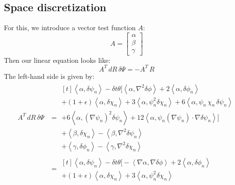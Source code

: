 \documentclass[reqno]{article}
\begin{document}
\subsection{Space discretization}
For this, we introduce a vector test function $A$:
\begin{equation}
    A
    =
    \begin{bmatrix}
        \alpha \\
        \beta \\
        \gamma
    \end{bmatrix}
\end{equation}
Then our linear equation looks like:
\begin{equation}
    A^T \, dR \, \delta \Psi
    =
    -A^T \, R
\end{equation}
The left-hand side is given by:
\begin{equation}
    \begin{split}
        A^T \, dR \, \delta \Psi
        &=
        \begin{multlined}[t]
            \left<\alpha, \delta \psi_n \right>
            - \delta t \theta \bigl[ \left< \alpha, \nabla^2 \delta \phi \right>
                + 2 \left< \alpha, \delta \phi_n \right> \\
                + \left(1 + \epsilon\right) \left< \alpha, \delta \chi_n \right>
                + 3 \left< \alpha, \psi_n^2 \delta \chi_n \right> 
                + 6 \left< \alpha, \psi_n \, \chi_n \, \delta \psi_n \right> \\
                + 6 \left<\alpha, \left(\nabla \psi_n\right)^2 \delta \psi_n \right>
                + 12 \left< \alpha, \psi_n \left(\nabla \psi_n \right) \cdot \nabla \delta \psi_n \right>
            \bigr] \\
            + \left< \beta, \delta \chi_n \right>
            - \left< \beta, \nabla^2 \delta \psi_n \right> \\
            + \left< \gamma, \delta \phi_n \right>
            - \left< \gamma, \nabla^2 \delta \chi_n \right>
        \end{multlined} \\
        &=
        \begin{multlined}[t]
            \left<\alpha, \delta \psi_n \right>
            - \delta t \theta \bigl[ -\left< \nabla \alpha, \nabla \delta \phi \right>
                + 2 \left< \alpha, \delta \phi_n \right> \\
                + \left(1 + \epsilon\right) \left< \alpha, \delta \chi_n \right>
                + 3 \left< \alpha, \psi_n^2 \delta \chi_n \right> 

\end{multlined}
\end{split}
\end{equation}
\end{document}
